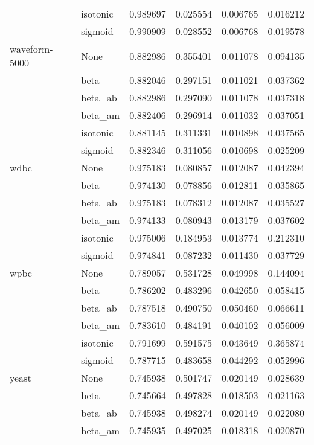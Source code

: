 \begin{tabular}{llrrrr}
        & isotonic &  0.989697 &  0.025554 &  0.006765 &  0.016212 \\
        & sigmoid &  0.990909 &  0.028552 &  0.006768 &  0.019578 \\
waveform-5000 & None &  0.882986 &  0.355401 &  0.011078 &  0.094135 \\
        & beta &  0.882046 &  0.297151 &  0.011021 &  0.037362 \\
        & beta\_ab &  0.882986 &  0.297090 &  0.011078 &  0.037318 \\
        & beta\_am &  0.882406 &  0.296914 &  0.011032 &  0.037051 \\
        & isotonic &  0.881145 &  0.311331 &  0.010898 &  0.037565 \\
        & sigmoid &  0.882346 &  0.311056 &  0.010698 &  0.025209 \\
wdbc & None &  0.975183 &  0.080857 &  0.012087 &  0.042394 \\
        & beta &  0.974130 &  0.078856 &  0.012811 &  0.035865 \\
        & beta\_ab &  0.975183 &  0.078312 &  0.012087 &  0.035527 \\
        & beta\_am &  0.974133 &  0.080943 &  0.013179 &  0.037602 \\
        & isotonic &  0.975006 &  0.184953 &  0.013774 &  0.212310 \\
        & sigmoid &  0.974841 &  0.087232 &  0.011430 &  0.037729 \\
wpbc & None &  0.789057 &  0.531728 &  0.049998 &  0.144094 \\
        & beta &  0.786202 &  0.483296 &  0.042650 &  0.058415 \\
        & beta\_ab &  0.787518 &  0.490750 &  0.050460 &  0.066611 \\
        & beta\_am &  0.783610 &  0.484191 &  0.040102 &  0.056009 \\
        & isotonic &  0.791699 &  0.591575 &  0.043649 &  0.365874 \\
        & sigmoid &  0.787715 &  0.483658 &  0.044292 &  0.052996 \\
yeast & None &  0.745938 &  0.501747 &  0.020149 &  0.028639 \\
        & beta &  0.745664 &  0.497828 &  0.018503 &  0.021163 \\
        & beta\_ab &  0.745938 &  0.498274 &  0.020149 &  0.022080 \\
        & beta\_am &  0.745935 &  0.497025 &  0.018318 &  0.020870 \\

\end{tabular}
